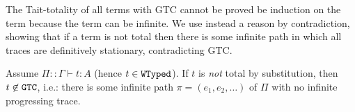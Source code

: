 
The Tait-totality of all terms with GTC cannot be proved be induction on the term because the term can be infinite. We use instead a reason by contradiction, showing that if a term is not total then there is some infinite path in which all traces are definitively stationary, contradicting GTC.




\begin{theorem}
\label{theorem-main-finite-safe-reduction}
  Assume $\Pi::\Gamma\vdash t : A$ (hence $t\in {\tt WTyped}$).
  If $t$ is \emph{not} total by substitution, then $t \not \in {\tt GTC}$, i.e.:
  there is some infinite path $\pi = (e_1, e_2, \ldots)$ of $\Pi$ with no infinite progressing trace. 
\end{theorem}


